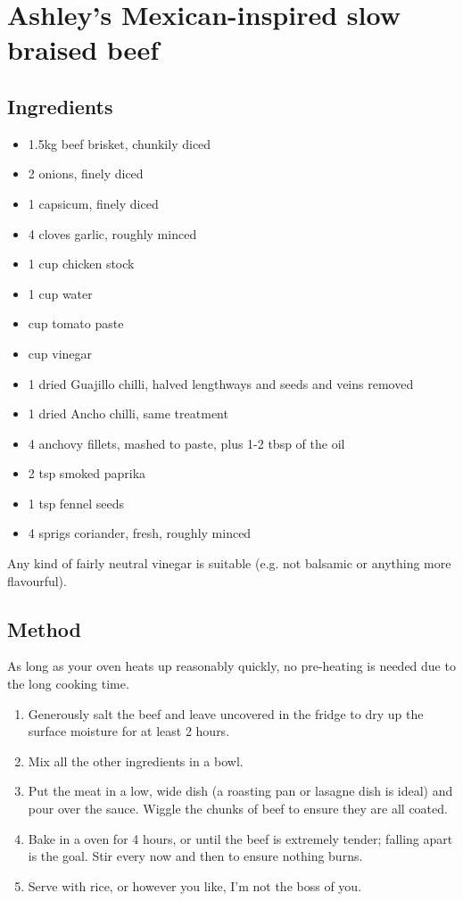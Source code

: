 \section{Ashley's Mexican-inspired slow braised beef}


\subsection{Ingredients}

\begin{itemize}
	\item 1.5kg beef brisket, chunkily diced
	\item 2 onions, finely diced
	\item 1 capsicum, finely diced
	\item 4 cloves garlic, roughly minced
	\item 1 cup chicken stock
	\item 1 cup water
	\item {} cup tomato paste
	\item {} cup vinegar
	\item 1 dried Guajillo chilli, halved lengthways and seeds and veins removed
	\item 1 dried Ancho chilli, same treatment
	\item 4 anchovy fillets, mashed to paste, plus 1-2 tbsp of the oil
	\item 2 tsp smoked paprika
	\item 1 tsp fennel seeds
	\item 4 sprigs coriander, fresh, roughly minced
\end{itemize}

Any kind of fairly neutral vinegar is suitable (e.g. not balsamic or anything more flavourful).

\subsection{Method}

As long as your oven heats up reasonably quickly, no pre-heating is needed due to the long cooking time.

\begin{enumerate}
	\item Generously salt the beef and leave uncovered in the fridge to dry up the surface moisture for at least 2 hours.
	\item Mix all the other ingredients in a bowl.
	\item Put the meat in a low, wide dish (a roasting pan or lasagne dish is ideal) and pour over the sauce. Wiggle the chunks of beef to ensure they are all coated.
	\item Bake in a  oven for 4 hours, or until the beef is extremely tender; falling apart is the goal. Stir every now and then to ensure nothing burns.
	\item Serve with rice, or however you like, I'm not the boss of you.
\end{enumerate}

